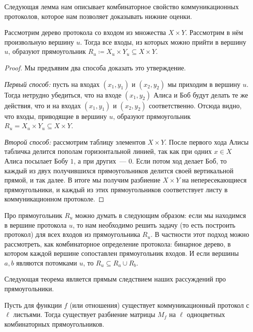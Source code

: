 Следующая лемма нам описывает комбинаторное свойство коммуникационных протоколов, которое нам позволяет
доказывать нижние оценки.

\begin{proposition}
    Рассмотрим дерево протокола со входом из множества $X \times Y$. Рассмотрим в нём произвольную
    вершину $u$. Тогда все входы, из которых можно прийти в вершину $u$, образуют прямоугольник
    $R_u \coloneqq X_u \times Y_u \subseteq X \times Y$.
\end{proposition}

\begin{proof}
    Мы предъявим два способа доказать это утверждение.
    
    \textit{Первый способ:} пусть на входах $(x_1, y_1)$ и $(x_2, y_2)$ мы приходим в вершину $u$. Тогда
    нетрудно убедиться, что на входе $(x_1, y_2)$ Алиса и Боб будут делать те же действия, что и на входах
    $(x_1, y_1)$ и $(x_2, y_2)$ соответственно. Отсюда видно, что входы, приводящие в вершину $u$,
    образуют прямоугольник $R_u = X_u \times Y_u \subseteq X \times Y$. 
    
    \textit{Второй способ:} рассмотрим таблицу элементов $X \times Y$. После первого хода Алисы табличка
    делится пополам горизонтальной линией, так как при одних $x \in X$ Алиса посылает Бобу $1$, а при
    других~--- $0$. Если потом ход делает Боб, то каждый из двух получившихся прямоугольников делится
    своей вертикальной прямой, и так далее. В итоге мы получим разбиение $X \times Y$ на непересекающиеся
    прямоугольники, и каждый из этих прямоугольников соответствует листу в коммуникационном протоколе.  
\end{proof}


Про прямоугольник $R_u$ можно думать в следующим образом: если мы находимся в вершине протокола $u$, то
нам необходимо решить задачу (то есть построить протокол) для всех входов из прямоугольника $R_u$. В
частности этот подход можно рассмотреть, как комбинаторное определение протокола: бинарное дерево, в
котором каждой вершине сопоставлен прямоугольник входов. И если вершины $a, b$ являются потомками $u$, то
$R_u \subseteq R_a \cup R_b$.

Следующая теорема является прямым следствием наших рассуждений про прямоугольники.

\begin{theorem}
    \label{th:rectangle-and-leaves}%
    Пусть для функции $f$ (или отношения) существует коммуникационный протокол с $\ell$ листьями. Тогда
    существует разбиение матрицы $M_f$ на $\ell$ одноцветных комбинаторных прямоугольников.
\end{theorem}


